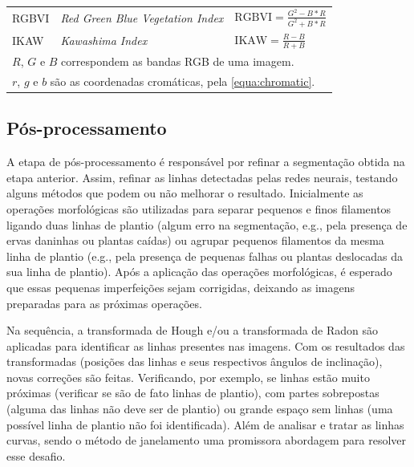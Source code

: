 \documentclass[12pt, a4paper, english, brazil]{article}
\begin{document}
\begin{table}[]
\begin{tabular}{@{}lll@{}}
        \multirow{2}{*}{RGBVI} & \multirow{2}{*}{\textit{Red Green Blue Vegetation Index}} & \multirow{2}{*}{$\displaystyle \text{RGBVI} = \frac{G^2 - B * R}{G^2 + B * R}$} \\
        & & \\ \midrule

        \multirow{2}{*}{IKAW} & \multirow{2}{*}{\textit{Kawashima Index}} & \multirow{2}{*}{$\displaystyle \text{IKAW} = \frac{R - B}{R + B}$} \\
        & & \\ \bottomrule

         \multicolumn{3}{l}{$R$, $G$ e $B$ correspondem as bandas RGB de uma imagem.} \\
         \multicolumn{3}{l}{$r$, $g$ e $b$ são as coordenadas cromáticas, pela \autoref{equa:chromatic}.} \\

    \end{tabular}
\end{table}

\subsection{Pós-processamento}

A etapa de pós-processamento é responsável por refinar a segmentação obtida na etapa anterior. Assim, refinar as linhas detectadas pelas redes neurais, testando alguns métodos que podem ou não melhorar o resultado. Inicialmente as operações morfológicas são utilizadas para separar pequenos e finos filamentos ligando duas linhas de plantio (algum erro na segmentação, e.g., pela presença de ervas daninhas ou plantas caídas) ou agrupar pequenos filamentos da mesma linha de plantio (e.g., pela presença de pequenas falhas ou plantas deslocadas da sua linha de plantio). Após a aplicação das operações morfológicas, é esperado que essas pequenas imperfeições sejam corrigidas, deixando as imagens preparadas para as próximas operações.

Na sequência, a transformada de Hough e/ou a transformada de Radon são aplicadas para identificar as linhas presentes nas imagens. Com os resultados das transformadas (posições das linhas e seus respectivos ângulos de inclinação), novas correções são feitas. Verificando, por exemplo, se linhas estão muito próximas (verificar se são de fato linhas de plantio), com partes sobrepostas (alguma das linhas não deve ser de plantio) ou grande espaço sem linhas (uma possível linha de plantio não foi identificada). Além de analisar e tratar as linhas curvas, sendo o método de janelamento uma promissora abordagem para resolver esse desafio.
\end{document}
